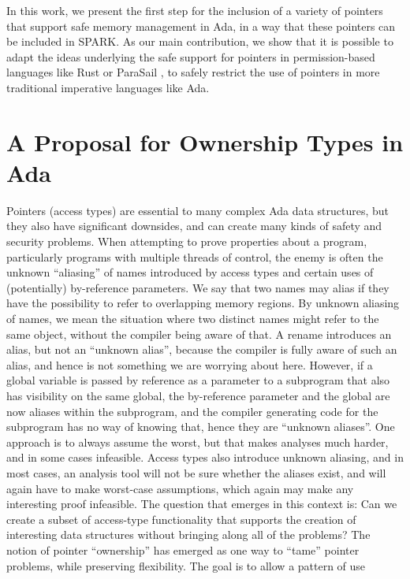 \documentclass{llncs}
\begin{document}
In this work, we present the first step for the inclusion of a variety of pointers that support safe memory management in Ada, in a way that these pointers can be included in SPARK. As our main contribution, we show that it is possible to adapt the ideas underlying the safe support for pointers in permission-based languages like Rust \cite{Balasubramanian17} or ParaSail , to safely restrict the use of pointers in more traditional imperative languages like Ada. 



\section{A Proposal for Ownership Types in Ada}
Pointers (access types) are essential to many complex Ada data structures, but they also have significant downsides, and can create many kinds of safety and security problems.
When attempting to prove properties about a program, particularly programs with multiple threads of control, the enemy is often the unknown ``aliasing'' of names introduced by
access types and certain uses of (potentially) by-reference parameters. We say that two names may alias if they have the possibility to refer to overlapping memory regions.
By unknown aliasing of names, we mean the situation where two distinct names might refer to the same object, without the compiler being aware of that.  A rename introduces
an alias, but not an ``unknown alias'', because the compiler is fully aware of such an alias, and hence is not something we are worrying about here. However, if a global
variable is passed by reference as a parameter to a subprogram that also has visibility on the same global, the by-reference parameter and the global are now aliases within
the subprogram, and the compiler generating code for the subprogram has no way of knowing that, hence they are ``unknown aliases''.  One approach is to always assume the worst,
but that makes analyses much harder, and in some cases infeasible. Access types also introduce unknown aliasing, and in most cases, an analysis tool will not be
sure whether the aliases exist, and will again have to make worst-case assumptions, which again may make any interesting proof infeasible.
The question that emerges in this context is: Can we create a subset of access-type functionality that supports the creation of interesting data structures without bringing along
all of the problems? The notion of pointer ``ownership'' has emerged as one way to ``tame'' pointer problems, while preserving flexibility.  The goal is to allow a pattern of use
\end{document}
